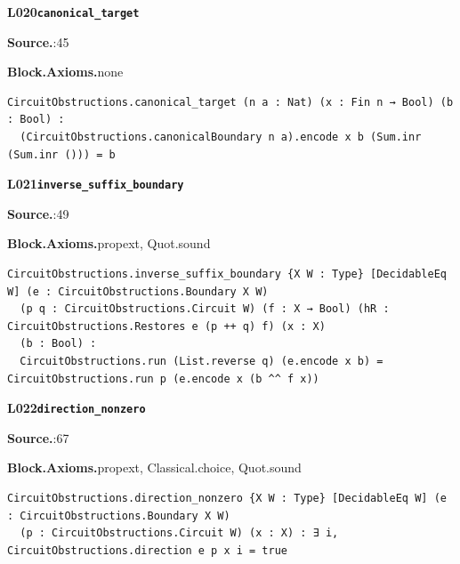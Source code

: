 \par\medskip\noindent\begin{minipage}{\textwidth}
{\small\bfseries L020\enspace\texttt{canonical\_target}\par}
{\footnotesize\raggedright\textbf{Source.}\enspace{}:45\par
\textbf{Block.}\quad\textbf{Axioms.}\enspace none\par}\nopagebreak
\begin{lstlisting}
CircuitObstructions.canonical_target (n a : Nat) (x : Fin n → Bool) (b : Bool) :
  (CircuitObstructions.canonicalBoundary n a).encode x b (Sum.inr (Sum.inr ())) = b
\end{lstlisting}
\end{minipage}\par

\par\medskip\noindent\begin{minipage}{\textwidth}
{\small\bfseries L021\enspace\texttt{inverse\_suffix\_boundary}\par}
{\footnotesize\raggedright\textbf{Source.}\enspace{}:49\par
\textbf{Block.}\quad\textbf{Axioms.}\enspace propext, Quot.sound\par}\nopagebreak
\begin{lstlisting}
CircuitObstructions.inverse_suffix_boundary {X W : Type} [DecidableEq W] (e : CircuitObstructions.Boundary X W)
  (p q : CircuitObstructions.Circuit W) (f : X → Bool) (hR : CircuitObstructions.Restores e (p ++ q) f) (x : X)
  (b : Bool) :
  CircuitObstructions.run (List.reverse q) (e.encode x b) = CircuitObstructions.run p (e.encode x (b ^^ f x))
\end{lstlisting}
\end{minipage}\par

\par\medskip\noindent\begin{minipage}{\textwidth}
{\small\bfseries L022\enspace\texttt{direction\_nonzero}\par}
{\footnotesize\raggedright\textbf{Source.}\enspace{}:67\par
\textbf{Block.}\quad\textbf{Axioms.}\enspace propext, Classical.choice, Quot.sound\par}\nopagebreak
\begin{lstlisting}
CircuitObstructions.direction_nonzero {X W : Type} [DecidableEq W] (e : CircuitObstructions.Boundary X W)
  (p : CircuitObstructions.Circuit W) (x : X) : ∃ i, CircuitObstructions.direction e p x i = true
\end{lstlisting}
\end{minipage}\par


